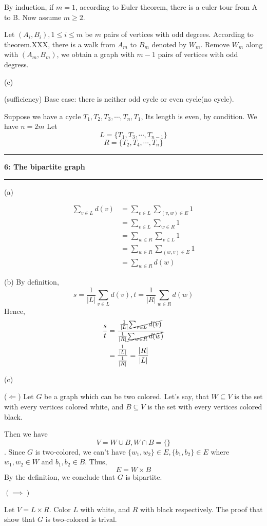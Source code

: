 \documentclass[11pt]{article}
\newcommand\question[2]{\vspace{.25in}\hrule\textbf{#1: #2}\vspace{.5em}\hrule\vspace{.10in}}
\begin{document}
By induction, if $m = 1$, according to Euler theorem, there is a euler tour from A to B.
Now assume $m \ge 2$.


Let $(A_i, B_i), 1 \le i\le m$ be $m$ pairs of vertices with odd degrees. According to theorem.XXX, there is a walk
from $A_m$ to $B_m$ denoted by $W_m$. Remove $W_m$ along with $(A_m, B_m)$, we obtain a graph with $m - 1$ pairs of vertices with odd degress.

(c)

(sufficiency)
Base case: there is neither odd cycle or even cycle(no cycle).




Suppose we have a cycle $T_1, T_2, T_3, \cdots, T_n, T_1$,
Its length is even, by condition. We have $n = 2m$ Let 
\[L = \{T_1, T_3, \cdots, T_{n-1}\}\]
\[R = \{T_2, T_4, \cdots, T_{n}\}\]

\question{6}{The bipartite graph}
(a)

\begin{align*}
    \sum_{v \in L} d(v) &= \sum_{v\in L}\sum_{(v, w)\in E}1 \\
                        &= \sum_{v\in L}\sum_{w\in R}1 \\
                        &= \sum_{w\in R}\sum_{v\in L}1 \\ 
                        &= \sum_{w\in R}\sum_{(w, v)\in E}1 \\
                        &= \sum_{w\in R}d(w)
\end{align*}

(b)
By definition,
\[s = \frac{1}{|L|}\sum_{v\in L}d(v), t = \frac{1}{|R|}\sum_{w\in R}d(w)\]
Hence,
\begin{align*}
    \frac{s}{t} &= \frac{\frac{1}{|L|}\cancel{\sum_{v\in L}d(v)}}{\frac{1}{|R|}\cancel{\sum_{w\in R}d(w)}} \\
                &= \frac{\frac{1}{|L|}}{\frac{1}{|R|}} =  \frac{|R|}{|L|}
\end{align*}

(c)

($\Longleftarrow$)
Let $G$ be a graph which can be two colored.
Let's say, that $W\subseteq V$ is the set with every vertices colored white, and
$B\subseteq V$ is the set with every vertices colored black.

Then we have \[V = W \cup B, W\cap B = \{\}\]. Since $G$ is two-colored, we can't have
$\{w_1, w_2\} \in E, \{b_1, b_2\}\in E$ where $w_1, w_2\in W$ and $ b_1, b_2\in B$. Thus,
\[E = W \times B\] By the definition, we conclude that $G$ is bipartite.

$(\implies)$

Let $V = L \times R$. Color $L$ with white, and $R$ with black respectively. The proof that show that $G$ is two-colored is trival.
\end{document}
